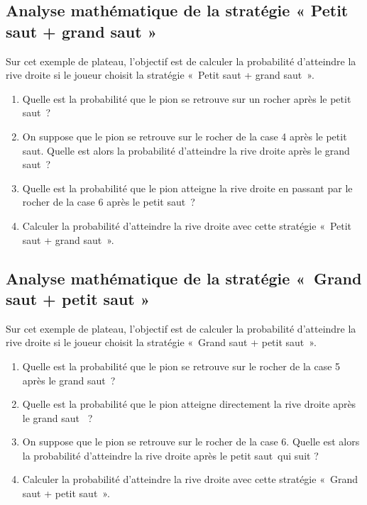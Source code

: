 \documentclass[a4paper,11pt,exos]{nsi} %
\begin{document}
\subsection*{Analyse mathématique de la stratégie « Petit saut + grand saut »}
Sur cet exemple de plateau, l’objectif est de calculer la probabilité d’atteindre la rive droite si le joueur choisit la stratégie « Petit saut + grand saut ».
\begin{enumerate}
    \item Quelle est la probabilité que le pion se retrouve sur un rocher après le petit saut ?\\[.5em]
    \item On suppose que le pion se retrouve sur le rocher de la case 4 après le petit saut. Quelle est alors la probabilité d’atteindre la rive droite après le grand saut ?\\[.5em]
    \item Quelle est la probabilité que le pion atteigne la rive droite en passant par le rocher de la case 6 après le petit saut ?\\[.5em]
    \item Calculer la probabilité d’atteindre la rive droite avec cette stratégie « Petit saut + grand saut ».\\[.5em]
\end{enumerate}

\subsection*{Analyse mathématique de la stratégie « Grand saut + petit saut »}
Sur cet exemple de plateau, l’objectif est de calculer la probabilité d’atteindre la rive droite si le joueur choisit la stratégie « Grand saut + petit saut ».
\begin{enumerate}
    \item Quelle est la probabilité que le pion se retrouve sur le rocher de la case 5 après le grand saut ?\\[.5em]
    \item Quelle est la probabilité que le pion atteigne directement la rive droite après le grand saut  ?\\[.5em]
    \item On suppose que le pion se retrouve sur le rocher de la case 6. Quelle est alors la probabilité d’atteindre la rive droite après le petit saut qui suit ?\\[.5em]
    \item Calculer la probabilité d’atteindre la rive droite avec cette stratégie « Grand saut + petit saut ».\\[.5em]
\end{enumerate}
\end{document}
